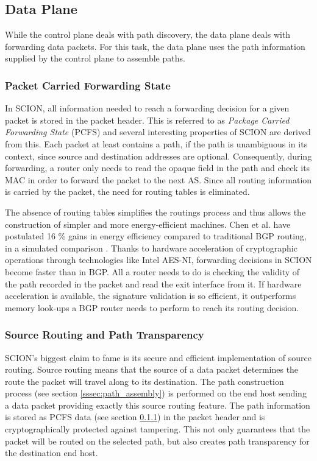 \documentclass[../eva1_scion.tex]{subfiles}
\begin{document}
    \subsection{Data Plane} \label{ssec:data_plane}
    While the control plane deals with path discovery, the data plane deals with forwarding data packets. For this task, the data plane uses the path information supplied by the control plane to assemble paths.

    \subsubsection{Packet Carried Forwarding State}\label{sssec:pcfs}
    In SCION, all information needed to reach a forwarding decision for a given packet is stored in the packet header. This is referred to as \textit{Package Carried Forwarding State} (PCFS) and several interesting properties of SCION are derived from this. Each packet at least contains a path, if the path is unambiguous in its context, since source and destination addresses are optional. Consequently, during forwarding, a router only needs to read the opaque field in the path and check its MAC in order to forward the packet to the next AS. Since all routing information is carried by the packet, the need for routing tables is eliminated.

    The absence of routing tables simplifies the routings process and thus allows the construction of simpler and more energy-efficient machines. Chen et al. have postulated 16 \% gains in energy efficiency compared to traditional BGP routing, in a simulated comparison \cite{scion_power}. Thanks to hardware acceleration of cryptographic operations through technologies like Intel AES-NI, forwarding decisions in SCION become faster than in BGP. All a router needs to do is checking the validity of the path recorded in the packet and read the exit interface from it. If hardware acceleration is available, the signature validation is so efficient, it outperforms memory look-ups a BGP router needs to perform to reach its routing decision.

    \subsubsection{Source Routing and Path Transparency} \label{sssec:source_routing}
    SCION's biggest claim to fame is its secure and efficient implementation of source routing. Source routing means that the source of a data packet determines the route the packet will travel along to its destination. The path construction process (see section \ref{sssec:path_assembly}) is performed on the end host sending a data packet providing exactly this source routing feature. The path information is stored as PCFS data (see section \ref{sssec:pcfs}) in the packet header and is cryptographically protected against tampering. This not only guarantees that the packet will be routed on the selected path, but also creates path transparency for the destination end host.
\end{document}
